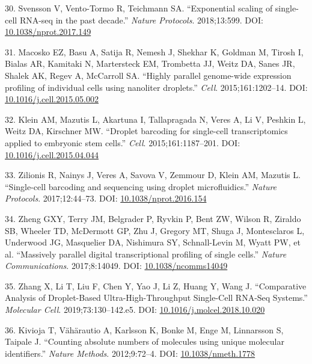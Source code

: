 \documentclass[11pt,a4paper,titlepage,twoside,openright]{style/unimelbthesis}
\theoremstyle{definition}
\theoremstyle{definition}
\theoremstyle{definition}
\theoremstyle{remark}
\begin{document}
\begin{mainmatter}
\leavevmode\hypertarget{ref-Svensson2018-dx}{}%
30. Svensson V, Vento-Tormo R, Teichmann SA. ``Exponential scaling of single-cell RNA-seq in the past decade.'' \emph{Nature Protocols}. 2018;13:599. DOI: \href{https://doi.org/10.1038/nprot.2017.149}{10.1038/nprot.2017.149}

\leavevmode\hypertarget{ref-Macosko2015-rl}{}%
31. Macosko EZ, Basu A, Satija R, Nemesh J, Shekhar K, Goldman M, Tirosh I, Bialas AR, Kamitaki N, Martersteck EM, Trombetta JJ, Weitz DA, Sanes JR, Shalek AK, Regev A, McCarroll SA. ``Highly parallel genome-wide expression profiling of individual cells using nanoliter droplets.'' \emph{Cell}. 2015;161:1202--14. DOI: \href{https://doi.org/10.1016/j.cell.2015.05.002}{10.1016/j.cell.2015.05.002}

\leavevmode\hypertarget{ref-Klein2015-iw}{}%
32. Klein AM, Mazutis L, Akartuna I, Tallapragada N, Veres A, Li V, Peshkin L, Weitz DA, Kirschner MW. ``Droplet barcoding for single-cell transcriptomics applied to embryonic stem cells.'' \emph{Cell}. 2015;161:1187--201. DOI: \href{https://doi.org/10.1016/j.cell.2015.04.044}{10.1016/j.cell.2015.04.044}

\leavevmode\hypertarget{ref-Zilionis2017-gu}{}%
33. Zilionis R, Nainys J, Veres A, Savova V, Zemmour D, Klein AM, Mazutis L. ``Single-cell barcoding and sequencing using droplet microfluidics.'' \emph{Nature Protocols}. 2017;12:44--73. DOI: \href{https://doi.org/10.1038/nprot.2016.154}{10.1038/nprot.2016.154}

\leavevmode\hypertarget{ref-Zheng2017-mm}{}%
34. Zheng GXY, Terry JM, Belgrader P, Ryvkin P, Bent ZW, Wilson R, Ziraldo SB, Wheeler TD, McDermott GP, Zhu J, Gregory MT, Shuga J, Montesclaros L, Underwood JG, Masquelier DA, Nishimura SY, Schnall-Levin M, Wyatt PW, et al. ``Massively parallel digital transcriptional profiling of single cells.'' \emph{Nature Communications}. 2017;8:14049. DOI: \href{https://doi.org/10.1038/ncomms14049}{10.1038/ncomms14049}

\leavevmode\hypertarget{ref-Zhang2019-vw}{}%
35. Zhang X, Li T, Liu F, Chen Y, Yao J, Li Z, Huang Y, Wang J. ``Comparative Analysis of Droplet-Based Ultra-High-Throughput Single-Cell RNA-Seq Systems.'' \emph{Molecular Cell}. 2019;73:130--142.e5. DOI: \href{https://doi.org/10.1016/j.molcel.2018.10.020}{10.1016/j.molcel.2018.10.020}

\leavevmode\hypertarget{ref-Kivioja2012-bq}{}%
36. Kivioja T, Vähärautio A, Karlsson K, Bonke M, Enge M, Linnarsson S, Taipale J. ``Counting absolute numbers of molecules using unique molecular identifiers.'' \emph{Nature Methods}. 2012;9:72--4. DOI: \href{https://doi.org/10.1038/nmeth.1778}{10.1038/nmeth.1778}


\end{mainmatter}
\end{document}
